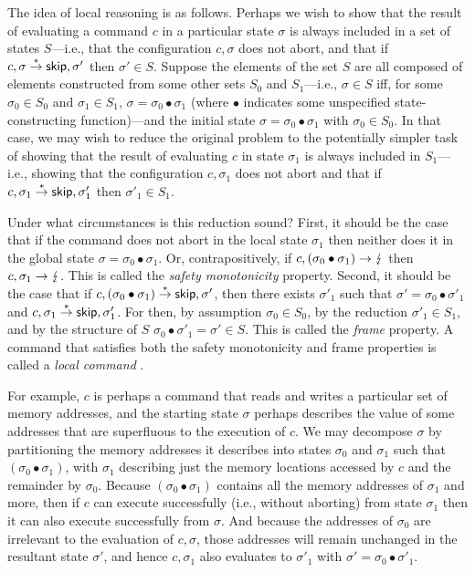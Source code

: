 \documentclass[11pt]{report}
\begin{document}
The idea of local reasoning is as follows. Perhaps we wish to show that the result of evaluating a command $c$ in a particular state $\sigma$ is always included in a set of states $S$---i.e., that the configuration $c,\sigma$ does not abort, and that if $c,\sigma \stackrel{\ast}{\rightarrow} \operatorname{\mathsf{skip}},\sigma'$ then $\sigma' \in S$. Suppose the elements of the set $S$ are all composed of elements constructed from some other sets $S_0$ and $S_1$---i.e., $\sigma \in S$ iff, for some $\sigma_0 \in S_0$ and $\sigma_1 \in S_1$, $\sigma = \sigma_0 \bullet \sigma_1$ (where $\bullet$ indicates some unspecified state-constructing function)---and the initial state $\sigma = \sigma_0 \bullet \sigma_1$ with $\sigma_0 \in S_0$. In that case, we may wish to reduce the original problem to the potentially simpler task of showing that the result of evaluating $c$ in state $\sigma_1$ is always included in $S_1$---i.e., showing that the configuration $c,\sigma_1$ does not abort and that if $c,\sigma_1 \stackrel{\ast}{\rightarrow} \operatorname{\mathsf{skip}},\sigma'_1$ then $\sigma'_1 \in S_1$. 

Under what circumstances is this reduction sound? First, it should be the case that if the command does not abort in the local state $\sigma_1$ then neither does it in the global state $\sigma = \sigma_0 \bullet \sigma_1$. Or, contrapositively, if $c,(\sigma_0 \bullet \sigma_1) \rightarrow \lightning$ then $c,\sigma_1 \rightarrow \lightning$. This is called the \emph{safety monotonicity} property. Second, it should be the case that if $c,(\sigma_0 \bullet \sigma_1) \stackrel{\ast}{\rightarrow} \operatorname{\mathsf{skip}},\sigma'$, then there exists $\sigma'_1$ such that $\sigma' = \sigma_0 \bullet \sigma'_1$ and $c,\sigma_1 \stackrel{\ast}{\rightarrow} \operatorname{\mathsf{skip}},\sigma'_1$. For then, by assumption $\sigma_0 \in S_0$, by the reduction $\sigma'_1 \in S_1$, and by the structure of $S$ $\sigma_0 \bullet \sigma'_1 = \sigma' \in S$. This is called the \emph{frame} property. A command that satisfies both the safety monotonicity and frame properties is called a \emph{local command} \cite{DBLP:conf/fossacs/YangO02}. 

For example, $c$ is perhaps a command that reads and writes a particular set of memory addresses, and the starting state $\sigma$ perhaps describes the value of some addresses that are superfluous to the execution of $c$. We may decompose $\sigma$ by partitioning the memory addresses it describes into states $\sigma_0$ and $\sigma_1$ such that $(\sigma_0 \bullet \sigma_1)$, with $\sigma_1$ describing just the memory locations accessed by $c$ and the remainder by $\sigma_0$. Because $(\sigma_0 \bullet \sigma_1)$ contains all the memory addresses of $\sigma_1$ and more, then if $c$ can execute successfully (i.e., without aborting) from state $\sigma_1$ then it can also execute successfully from $\sigma$. And because the addresses of $\sigma_0$ are irrelevant to the evaluation of $c,\sigma$, those addresses will remain unchanged in the resultant state $\sigma'$, and hence $c,\sigma_1$ also evaluates to $\sigma'_1$ with $\sigma' = \sigma_0 \bullet \sigma'_1$. 
\end{document}
